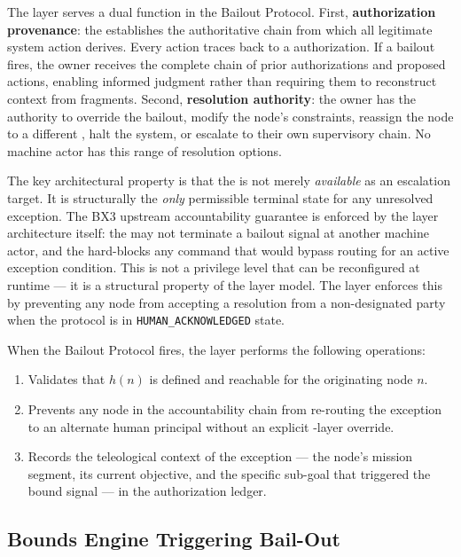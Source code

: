 The \purpose{} layer serves a dual function in the Bailout Protocol. First, \textbf{authorization provenance}: the \purpose{} establishes the authoritative chain from which all legitimate system action derives. Every \bounds{} action traces back to a \purpose{} authorization. If a bailout fires, the \purpose{} owner receives the complete chain of prior authorizations and proposed actions, enabling informed judgment rather than requiring them to reconstruct context from fragments. Second, \textbf{resolution authority}: the \purpose{} owner has the authority to override the bailout, modify the node's constraints, reassign the node to a different \bounds{}, halt the system, or escalate to their own supervisory chain. No machine actor has this range of resolution options.

The key architectural property is that the \purpose{} is not merely \textit{available} as an escalation target. It is structurally the \textit{only} permissible terminal state for any unresolved exception. The BX3 upstream accountability guarantee is enforced by the layer architecture itself: the \bounds{} may not terminate a bailout signal at another machine actor, and the \fact{} hard-blocks any command that would bypass \purpose{} routing for an active exception condition. This is not a privilege level that can be reconfigured at runtime — it is a structural property of the layer model. The \purpose{} layer enforces this by preventing any node from accepting a resolution from a non-designated party when the protocol is in \texttt{HUMAN\_ACKNOWLEDGED} state.

When the Bailout Protocol fires, the \purpose{} layer performs the following operations:

\begin{enumerate}
\item Validates that $h(n)$ is defined and reachable for the originating node $n$.
\item Prevents any node in the accountability chain from re-routing the exception to an alternate human principal without an explicit \purpose{}-layer override.
\item Records the teleological context of the exception — the node's mission segment, its current objective, and the specific sub-goal that triggered the bound signal — in the authorization ledger.
\end{enumerate}

\subsection{Bounds Engine Triggering Bail-Out}
\label{sec:bounds-trigger}

